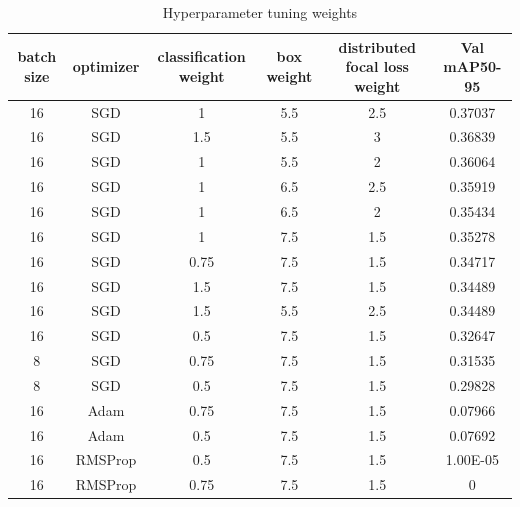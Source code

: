\documentclass[10pt,twocolumn,letterpaper]{article}
\begin{document}
\begin{table}
    \begin{center}
    \begin{tabular}{|c|ccccc|}
        \hline
        batch size & optimizer & classification weight & box weight & distributed focal loss weight & Val mAP50-95 \\
        \hline
        16 & SGD & 1 & 5.5 & 2.5 & 0.37037 \\
        16 & SGD & 1.5 & 5.5 & 3 & 0.36839 \\
        16 & SGD & 1 & 5.5 & 2 & 0.36064 \\
        16 & SGD & 1 & 6.5 & 2.5 & 0.35919 \\
        16 & SGD & 1 & 6.5 & 2 & 0.35434 \\
        16 & SGD & 1 & 7.5 & 1.5 & 0.35278 \\
        16 & SGD & 0.75 & 7.5 & 1.5 & 0.34717 \\
        16 & SGD & 1.5 & 7.5 & 1.5 & 0.34489 \\
        16 & SGD & 1.5 & 5.5 & 2.5 & 0.34489 \\
        16 & SGD & 0.5 & 7.5 & 1.5 & 0.32647 \\
        8 & SGD & 0.75 & 7.5 & 1.5 & 0.31535 \\
        8 & SGD & 0.5 & 7.5 & 1.5 & 0.29828 \\
        16 & Adam & 0.75 & 7.5 & 1.5 & 0.07966 \\
        16 & Adam & 0.5 & 7.5 & 1.5 & 0.07692 \\
        16 & RMSProp & 0.5 & 7.5 & 1.5 & 1.00E-05 \\
        16 & RMSProp & 0.75 & 7.5 & 1.5 & 0 \\
        \hline
    \end{tabular}
    \end{center}
    \caption{Hyperparameter tuning weights}
    \label{tab:Hyper_param_tune_2}
\end{table}
\end{document}
